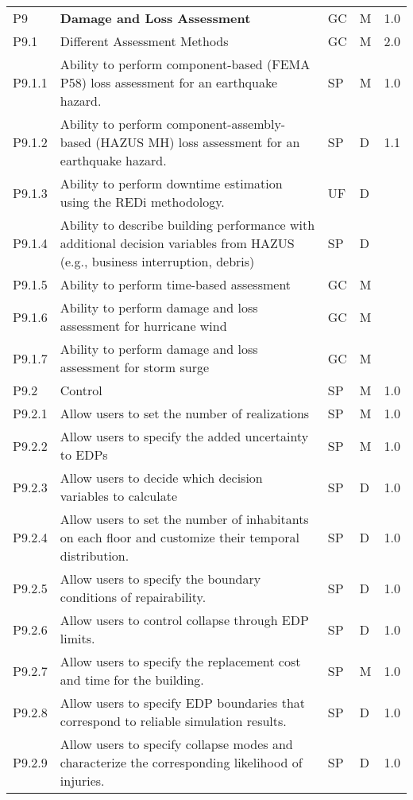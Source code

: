 \begin{longtable}{| p{} | p{} | p{} | p{} |  p{} |}
P9 & \textbf{Damage and Loss Assessment} & GC & M & 1.0\\ 
P9.1 & Different Assessment Methods & GC & M & 2.0 \\ \hline
P9.1.1 & Ability to perform component-based (FEMA P58) loss assessment for an earthquake hazard. & SP & M & 1.0 \\ \hline
P9.1.2 & Ability to perform component-assembly-based (HAZUS MH) loss assessment for an earthquake hazard. & SP & D & 1.1 \\ \hline
P9.1.3 & Ability to perform downtime estimation using the REDi methodology. & UF & D & \\ \hline
P9.1.4 & Ability to describe building performance with additional decision variables from HAZUS (e.g., business interruption, debris) & SP & D &  \\ \hline
P9.1.5 &  Ability to perform time-based assessment & GC & M &  \\ \hline
P9.1.6 & Ability to perform damage and loss assessment for hurricane wind & GC & M &  \\ \hline
P9.1.7 & Ability to perform damage and loss assessment for storm surge & GC & M &  \\ \hline
P9.2 & Control & SP & M & 1.0 \\ \hline
P9.2.1 & Allow users to set the number of realizations & SP & M & 1.0\\ \hline
P9.2.2 &  Allow users to specify the added uncertainty to EDPs & SP & M & 1.0 \\ \hline
P9.2.3 &  Allow users to decide which decision variables to calculate & SP & D & 1.0 \\ \hline
P9.2.4 &  Allow users to set the number of inhabitants on each floor and customize their temporal distribution. & SP & D & 1.0 \\ \hline
P9.2.5 &  Allow users to specify the boundary conditions of repairability. & SP & D & 1.0 \\ \hline
P9.2.6 &  Allow users to control collapse through EDP limits. & SP & D & 1.0\\ \hline
P9.2.7 &  Allow users to specify the replacement cost and time for the building. & SP & M & 1.0 \\ \hline
P9.2.8 &  Allow users to specify EDP boundaries that correspond to reliable simulation results. & SP & D & 1.0\\ \hline
P9.2.9 & Allow users to specify collapse modes and characterize the corresponding likelihood of injuries. & SP & D & 1.0\\ \hline

\end{longtable}
